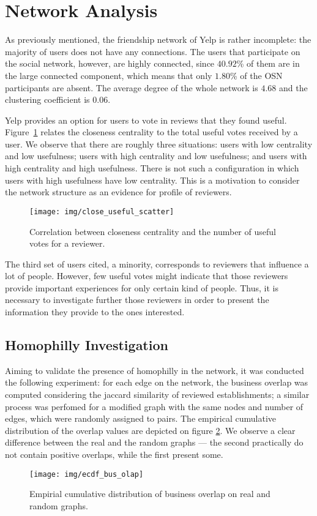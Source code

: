 \section{Network Analysis}
As previously mentioned, the friendship network of Yelp is rather incomplete: the majority of users does not have any connections. The users that participate on the social network, however, are highly connected, since $40.92$\% of them are in the large connected component, which means that only $1.80$\% of the OSN participants are absent. The average degree of the whole network is $4.68$ and the clustering coefficient is $0.06$.

Yelp provides an option for users to vote in reviews that they found useful. Figure~\ref{fig:clo_use} relates the closeness centrality to the total useful votes received by a user. We observe that there are roughly three situations: users with low centrality and low usefulness; users with high centrality and low usefulness; and users with high centrality and high usefulness. There is not such a configuration in which users with high usefulness have low centrality. This is a motivation to consider the network structure as an evidence for profile of reviewers.

\begin{figure}[H]
\centering
\texttt{[image: img/close\_useful\_scatter]}
\caption{Correlation between closeness centrality and the number of useful votes for a reviewer.}
\label{fig:clo_use}
\end{figure}

The third set of users cited, a minority, corresponds to reviewers that influence a lot of people. However, few useful votes might indicate that those reviewers provide important experiences for only certain kind of people. Thus, it is necessary to investigate further those reviewers in order to present the information they provide to the ones interested.

\subsection{Homophilly Investigation}

Aiming to validate the presence of homophilly in the network, it was conducted the following experiment: for each edge on the network, the business overlap was computed considering the jaccard similarity of reviewed establishments; a similar process was perfomed for a modified graph with the same nodes and number of edges, which were randomly assigned to pairs. The empirical cumulative distribution of the overlap values are depicted on figure \ref{fig:bus_olap}. We observe a clear difference between the real and the random graphs --- the second practically do not contain positive overlaps, while the first present some.

\begin{figure}[H]
\centering
\texttt{[image: img/ecdf\_bus\_olap]}
\caption{Empirial cumulative distribution of business overlap on real and random graphs.}
\label{fig:bus_olap}
\end{figure}

